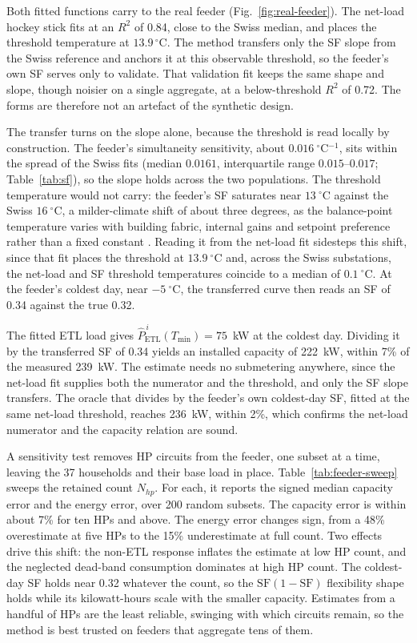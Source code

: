 \documentclass[9pt,journal,a4]{IEEEtran}
\newcommand{\chg}[1]{\textcolor{chgblue}{#1}}
\begin{document}
\chg{Both fitted functions carry to the real feeder (Fig.~\ref{fig:real-feeder}). The net-load hockey stick fits at an $R^2$ of 0.84, close to the Swiss median, and places the threshold temperature at $13.9\,^\circ$C. The method transfers only the SF slope from the Swiss reference and anchors it at this observable threshold, so the feeder's own SF serves only to validate. That validation fit keeps the same shape and slope, though noisier on a single aggregate, at a below-threshold $R^2$ of 0.72. The forms are therefore not an artefact of the synthetic design.}

\chg{The transfer turns on the slope alone, because the threshold is read locally by construction. The feeder's simultaneity sensitivity, about $0.016~^\circ$C$^{-1}$, sits within the spread of the Swiss fits (median $0.0161$, interquartile range $0.015$--$0.017$; Table~\ref{tab:sf}), so the slope holds across the two populations. The threshold temperature would not carry: the feeder's SF saturates near $13~^\circ$C against the Swiss $16~^\circ$C, a milder-climate shift of about three degrees, as the balance-point temperature varies with building fabric, internal gains and setpoint preference rather than a fixed constant \cite{Men18}. Reading it from the net-load fit sidesteps this shift, since that fit places the threshold at $13.9~^\circ$C and, across the Swiss substations, the net-load and SF threshold temperatures coincide to a median of $0.1~^\circ$C. At the feeder's coldest day, near $-5~^\circ$C, the transferred curve then reads an SF of 0.34 against the true 0.32.}

The fitted ETL load gives $\hat{P}_{\mathrm{ETL}}^{\,i}(T_{\min}) = 75$~kW at the coldest day. \chg{Dividing it by the transferred SF of 0.34 yields an installed capacity of 222~kW, within 7\% of the measured 239~kW. The estimate needs no submetering anywhere, since the net-load fit supplies both the numerator and the threshold, and only the SF slope transfers.} The oracle that divides by the feeder's own coldest-day SF, \chg{fitted at the same net-load threshold, reaches 236~kW, within 2\%}, which confirms the net-load numerator and the capacity relation are sound.

A sensitivity test removes HP circuits from the feeder, one subset at a time, leaving the 37 households and their base load in place. Table~\ref{tab:feeder-sweep} sweeps the retained count $N_{hp}$. \chg{For each, it reports the signed median capacity error and the energy error, over 200 random subsets. The capacity error is within about 7\% for ten HPs and above.} The energy error changes sign, from a 48\% overestimate at five HPs to the 15\% underestimate at full count. Two effects drive this shift: the non-ETL response inflates the estimate at low HP count, and the neglected dead-band consumption dominates at high HP count. The coldest-day SF holds near 0.32 whatever the count, so the $\mathrm{SF}(1-\mathrm{SF})$ flexibility shape holds while its kilowatt-hours scale with the smaller capacity. Estimates from a handful of HPs are the least reliable, swinging with which circuits remain, so the method is best trusted on feeders that aggregate tens of them.
\end{document}
